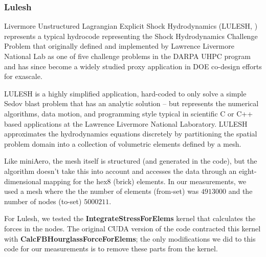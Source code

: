 \subsubsection{Lulesh}\label{sec:lulesh-summary}
Livermore Unstructured Lagrangian Explicit Shock Hydrodynamics (LULESH,
\cite{LULESH2:changes}) represents a typical hydrocode representing the Shock
Hydrodynamics Challenge Problem that originally defined and implemented by
Lawrence Livermore National Lab as one of five challenge problems in the DARPA
UHPC program and has since become a widely studied proxy application in DOE
co-design efforts for exascale. 

LULESH is a highly simplified application, hard-coded to only solve a simple
Sedov blast problem that has an analytic solution \cite{LULESH:spec} – but
represents the numerical algorithms, data motion, and programming style typical
in scientific C or C++ based applications at the Lawrence Livermore National
Laboratory. LULESH approximates the hydrodynamics equations discretely by
partitioning the spatial problem domain into a collection of volumetric elements
defined by a mesh.

Like miniAero, the mesh itself is structured (and generated in the code), but
the algorithm doesn't take this into account and accesses the data through an
eight-dimensional mapping for the hex8 (brick) elements. In our measurements, we
used a mesh where the the number of elements (from-set) was $4913000$ and the
number of nodes (to-set) $5000211$.

For Lulesh, we tested the \textbf{IntegrateStressForElems} kernel that
calculates the forces in the nodes. The original CUDA version of the code
contracted this kernel with \textbf{CalcFBHourglassForceForElems}; the only
modifications we did to this code for our measurements is to remove these parts
from the kernel.

